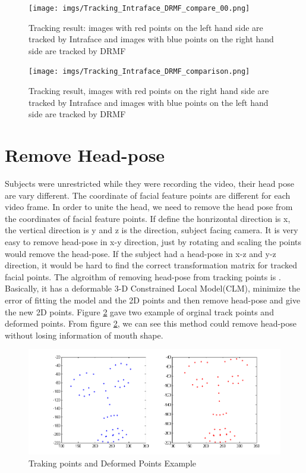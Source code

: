 \begin{figure}
\centering
\texttt{[image: imgs/Tracking\_Intraface\_DRMF\_compare\_00.png]}
\caption{Tracking result: images with red points on the left hand side are tracked by Intraface and images with blue points on the right hand side are tracked by DRMF}
\label{fig:cmp01}
\texttt{[image: imgs/Tracking\_Intraface\_DRMF\_comparison.png]}
\caption{Tracking result, images with red points on the right hand side are tracked by Intraface and images with blue points on the left hand side are tracked by DRMF}
\label{fig:cmp02}
\end{figure}
\newpage
\section{Remove Head-pose}
Subjects were unrestricted while they were recording the video, their head pose are vary different. The coordinate of facial feature points are different for each video frame. In order to unite the head, we need to remove the head pose from the coordinates of facial feature points.  If define the honrizontal direction is x, the vertical direction is y and z is the direction, subject facing camera. It is very easy to remove head-pose in x-y direction, just by rotating and scaling the points would remove the head-pose. If the subject had a head-pose in x-z and y-z direction, it would be hard to find the correct transformation matrix for tracked facial points. The algroithm of removing head-pose from tracking points is \cite{saragih2011deformable}. Basically, it has a deformable 3-D Constrained Local Model(CLM), minimize the error of fitting the model and the 2D points and then remove head-pose and give the new 2D points. Figure \ref{fig:RHP} gave two example of orginal track points and deformed points. From figure \ref{fig:RHP}, we can see this method could remove head-pose without losing information of mouth shape.
\begin{figure}[ht]
\centering
\includegraphics[width=150mm]{imgs/160954_Deform_233.png}
\caption{Traking points and Deformed Points Example}
\label{fig:RHP}
\end{figure}
